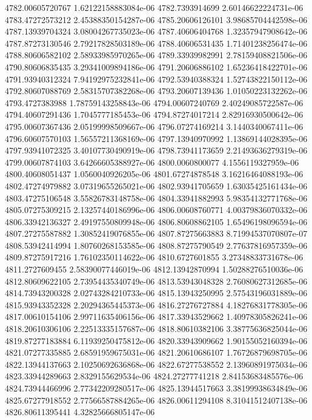 {4782.00605720767 1.62122158883084e-06
4782.7393914699 2.60146622224731e-06
4783.47272573212 2.45388350154287e-06
4785.20606126101 3.98685704442598e-06
4787.13939704324 3.08004267735023e-06
4787.40606404768 1.32357947908642e-06
4787.87273130546 2.79217828503189e-06
4788.40606531435 1.71401238256474e-06
4788.80606582102 2.58933985970265e-06
4789.33939982991 2.78159408821506e-06
4790.80606835435 3.29341009894186e-06
4791.20606886102 1.65236418422701e-06
4791.93940312324 7.94192975232841e-06
4792.53940388324 1.52743822150112e-06
4792.80607088769 2.58315707382268e-06
4793.20607139436 1.01050223132262e-06
4793.4727383988 1.78759143258843e-06
4794.00607240769 2.40249085722587e-06
4794.40607291436 1.7045777185453e-06
4794.87274017214 2.82916930500642e-06
4795.00607367436 2.05199998509667e-06
4796.07274169214 3.1440340067411e-06
4796.60607570103 1.56557211368169e-06
4797.13940970992 1.13869144028395e-06
4797.93941072325 3.40107730490919e-06
4798.73941173659 2.21493636279319e-06
4799.00607874103 3.64266605388927e-06
4800.0060800077 4.1556119327959e-06
4800.40608051437 1.0560040926205e-06
4801.67274878548 3.16216464088193e-06
4802.47274979882 3.07319655265021e-06
4802.93941705659 1.63035425161434e-06
4803.47275106548 3.55826783148758e-06
4804.33941882993 5.98354132771768e-06
4805.07275309215 2.13257440186996e-06
4806.00608760771 4.00379836070332e-06
4806.33942136327 2.49197550809948e-06
4806.80608862105 1.65496198096594e-06
4807.27275587882 1.30852419076855e-06
4807.87275663883 8.71994537070807e-07
4808.53942414994 1.80760268153585e-06
4808.87275790549 2.77637816957359e-06
4809.87275917216 1.76102350114622e-06
4810.6727601855 3.27348833731678e-06
4811.2727609455 2.58390077446019e-06
4812.13942870994 1.50288276510036e-06
4812.80609622105 2.73954435340749e-06
4813.53943048328 2.76080627312685e-06
4814.73943200328 2.02743284210733e-06
4815.13943250995 2.57543196031889e-06
4815.93943352328 2.20294365445373e-06
4816.27276727884 4.18276831778305e-06
4817.00610154106 2.99711635406156e-06
4817.33943529662 1.40978305826241e-06
4818.20610306106 2.22513335157687e-06
4818.80610382106 3.38775636825044e-06
4819.87277183884 6.11939250475812e-06
4820.33943909662 1.90155052160394e-06
4821.07277335885 2.68591959675031e-06
4821.20610686107 1.76726879698705e-06
4822.13944137663 2.10250692636868e-06
4822.67277538552 2.13960891975034e-06
4823.33944289663 2.8329155629534e-06
4824.27277741218 2.84153683485576e-06
4824.73944466996 2.77342209280517e-06
4825.13944517663 3.38199938634849e-06
4825.67277918552 2.77566587884265e-06
4826.00611294108 8.31041512407138e-06
4826.80611395441 4.32825666805147e-06
}
